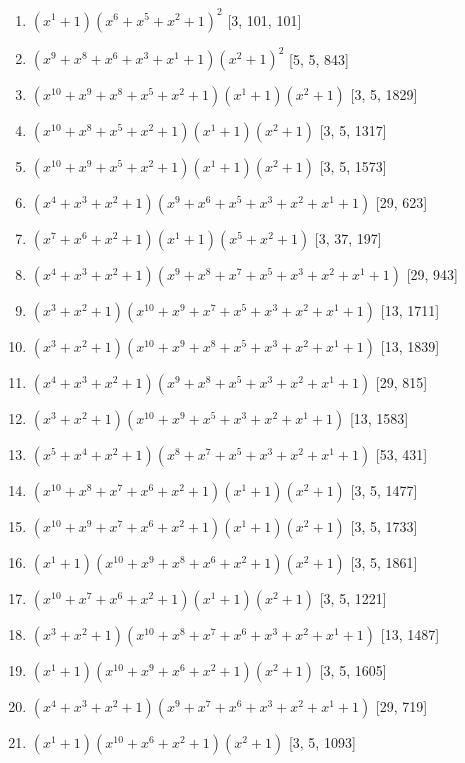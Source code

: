 \documentclass[10pt,twocolumn]{article}
\begin{document}
\begin{enumerate}
\item $(x^{1} + 1)(x^{6} + x^{5} + x^{2} + 1)^{2}$  [3, 101, 101]
\item $(x^{9} + x^{8} + x^{6} + x^{3} + x^{1} + 1)(x^{2} + 1)^{2}$  [5, 5, 843]
\item $(x^{10} + x^{9} + x^{8} + x^{5} + x^{2} + 1)(x^{1} + 1)(x^{2} + 1)$  [3, 5, 1829]
\item $(x^{10} + x^{8} + x^{5} + x^{2} + 1)(x^{1} + 1)(x^{2} + 1)$  [3, 5, 1317]
\item $(x^{10} + x^{9} + x^{5} + x^{2} + 1)(x^{1} + 1)(x^{2} + 1)$  [3, 5, 1573]
\item $(x^{4} + x^{3} + x^{2} + 1)(x^{9} + x^{6} + x^{5} + x^{3} + x^{2} + x^{1} + 1)$  [29, 623]
\item $(x^{7} + x^{6} + x^{2} + 1)(x^{1} + 1)(x^{5} + x^{2} + 1)$  [3, 37, 197]
\item $(x^{4} + x^{3} + x^{2} + 1)(x^{9} + x^{8} + x^{7} + x^{5} + x^{3} + x^{2} + x^{1} + 1)$  [29, 943]
\item $(x^{3} + x^{2} + 1)(x^{10} + x^{9} + x^{7} + x^{5} + x^{3} + x^{2} + x^{1} + 1)$  [13, 1711]
\item $(x^{3} + x^{2} + 1)(x^{10} + x^{9} + x^{8} + x^{5} + x^{3} + x^{2} + x^{1} + 1)$  [13, 1839]
\item $(x^{4} + x^{3} + x^{2} + 1)(x^{9} + x^{8} + x^{5} + x^{3} + x^{2} + x^{1} + 1)$  [29, 815]
\item $(x^{3} + x^{2} + 1)(x^{10} + x^{9} + x^{5} + x^{3} + x^{2} + x^{1} + 1)$  [13, 1583]
\item $(x^{5} + x^{4} + x^{2} + 1)(x^{8} + x^{7} + x^{5} + x^{3} + x^{2} + x^{1} + 1)$  [53, 431]
\item $(x^{10} + x^{8} + x^{7} + x^{6} + x^{2} + 1)(x^{1} + 1)(x^{2} + 1)$  [3, 5, 1477]
\item $(x^{10} + x^{9} + x^{7} + x^{6} + x^{2} + 1)(x^{1} + 1)(x^{2} + 1)$  [3, 5, 1733]
\item $(x^{1} + 1)(x^{10} + x^{9} + x^{8} + x^{6} + x^{2} + 1)(x^{2} + 1)$  [3, 5, 1861]
\item $(x^{10} + x^{7} + x^{6} + x^{2} + 1)(x^{1} + 1)(x^{2} + 1)$  [3, 5, 1221]
\item $(x^{3} + x^{2} + 1)(x^{10} + x^{8} + x^{7} + x^{6} + x^{3} + x^{2} + x^{1} + 1)$  [13, 1487]
\item $(x^{1} + 1)(x^{10} + x^{9} + x^{6} + x^{2} + 1)(x^{2} + 1)$  [3, 5, 1605]
\item $(x^{4} + x^{3} + x^{2} + 1)(x^{9} + x^{7} + x^{6} + x^{3} + x^{2} + x^{1} + 1)$  [29, 719]
\item $(x^{1} + 1)(x^{10} + x^{6} + x^{2} + 1)(x^{2} + 1)$  [3, 5, 1093]

\end{enumerate}
\end{document}

